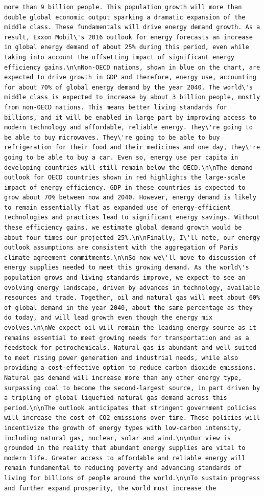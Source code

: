 \documentclass[
  letterpaper,
  DIV=11,
  numbers=noendperiod]{scrreprt}
\begin{document}
\begin{verbatim}
more than 9 billion people. This population growth will more than double global economic output sparking a dramatic expansion of the middle class. These fundamentals will drive energy demand growth. As a result, Exxon Mobil\'s 2016 outlook for energy forecasts an increase in global energy demand of about 25% during this period, even while taking into account the offsetting impact of significant energy efficiency gains.\n\nNon-OECD nations, shown in blue on the chart, are expected to drive growth in GDP and therefore, energy use, accounting for about 70% of global energy demand by the year 2040. The world\'s middle class is expected to increase by about 3 billion people, mostly from non-OECD nations. This means better living standards for billions, and it will be enabled in large part by improving access to modern technology and affordable, reliable energy. They\'re going to be able to buy microwaves. They\'re going to be able to buy refrigeration for their food and their medicines and one day, they\'re going to be able to buy a car. Even so, energy use per capita in developing countries will still remain below the OECD.\n\nThe demand outlook for OECD countries shown in red highlights the large-scale impact of energy efficiency. GDP in these countries is expected to grow about 70% between now and 2040. However, energy demand is likely to remain essentially flat as expanded use of energy-efficient technologies and practices lead to significant energy savings. Without these efficiency gains, we estimate global demand growth would be about four times our projected 25%.\n\nFinally, I\'ll note, our energy outlook assumptions are consistent with the aggregation of Paris climate agreement commitments.\n\nSo now we\'ll move to discussion of energy supplies needed to meet this growing demand. As the world\'s population grows and living standards improve, we expect to see an evolving energy landscape, driven by advances in technology, available resources and trade. Together, oil and natural gas will meet about 60% of global demand in the year 2040, about the same percentage as they do today, and will lead growth even though the energy mix evolves.\n\nWe expect oil will remain the leading energy source as it remains essential to meet growing needs for transportation and as a feedstock for petrochemicals. Natural gas is abundant and well suited to meet rising power generation and industrial needs, while also providing a cost-effective option to reduce carbon dioxide emissions. Natural gas demand will increase more than any other energy type, surpassing coal to become the second-largest source, in part driven by a tripling of global liquefied natural gas demand across this period.\n\nThe outlook anticipates that stringent government policies will increase the cost of CO2 emissions over time. These policies will incentivize the growth of energy types with low-carbon intensity, including natural gas, nuclear, solar and wind.\n\nOur view is grounded in the reality that abundant energy supplies are vital to modern life. Greater access to affordable and reliable energy will remain fundamental to reducing poverty and advancing standards of living for billions of people around the world.\n\nTo sustain progress and further expand prosperity, the world must increase the 
\end{verbatim}
\end{document}
